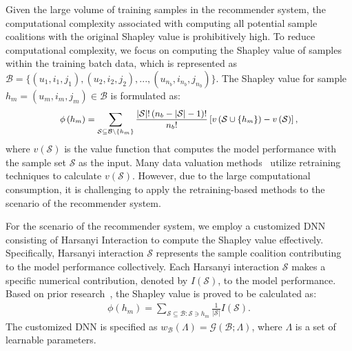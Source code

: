 Given the large volume of training samples in the recommender system, the computational complexity associated with computing all potential sample coalitions with the original Shapley value is prohibitively high. To reduce computational complexity, we focus on computing the Shapley value of samples within the training batch data, which is represented as $\mathcal{B}= \{(u_1, i_1, j_1), (u_2, i_2, j_2), ..., (u_{n_b}, i_{n_b}, j_{n_b})\}$. The Shapley value for sample $h_m =(u_m, i_m, j_m)\in \mathcal{B}$ is formulated as:
\begin{equation}
\small
\begin{aligned}
\phi\left(h_m\right)=\sum_{\mathcal{S}\subseteq \mathcal{B}\setminus \{h_m\}}\frac{\left|\mathcal{S}\right|!\left(n_b-\left|\mathcal{S}\right|-1\right)!}{n_b!}\left[v\left(\mathcal{S}\cup \{h_m\}\right)-v\left(\mathcal{S}\right)\right],
\end{aligned}
\end{equation}
where $v(\mathcal{S})$ is the value function that computes the model performance with the sample set $\mathcal{S}$ as the input. Many data valuation methods~\cite{ghorbani2019data} utilize retraining techniques to calculate $v(\mathcal{S})$. However, due to the large computational consumption, it is challenging to apply the retraining-based methods to the scenario of the recommender system.

For the scenario of the recommender system, we employ a customized DNN consisting of Harsanyi Interaction to compute the Shapley value effectively. Specifically, Harsanyi interaction $\mathcal{S}$ represents the sample coalition contributing to the model performance collectively. Each Harsanyi interaction $\mathcal{S}$ makes a specific numerical contribution, denoted by $I(\mathcal{S})$, to the model performance. Based on prior research~\cite{harsanyi1982simplified}, the Shapley value is proved to be calculated as:
\begin{equation}
    \label{eq:interaction}
    \begin{aligned}
        \phi(h_m)=\sum_{\mathcal{S}\subseteq \mathcal{B}:\mathcal{S}\ni h_m}\frac1{|\mathcal{S}|}I(\mathcal{S}).
    \end{aligned}
\end{equation} The customized DNN is specified as $w_{\mathcal{B}}(\Lambda)=\mathcal{G}(\mathcal{B};\Lambda)$, where $\Lambda$ is a set of learnable parameters.

